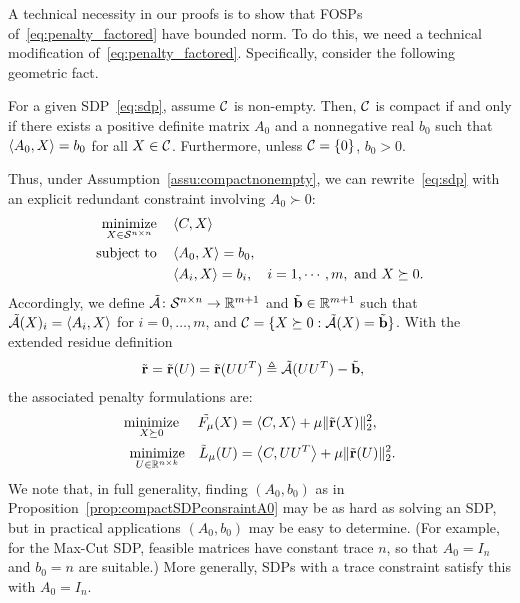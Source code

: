 A technical necessity in our proofs is to show that FOSPs of~\eqref{eq:penalty_factored} have bounded norm. To do this, we need a technical modification of~\eqref{eq:penalty_factored}. Specifically, consider the following geometric fact.
\begin{proposition}\label{prop:compactSDPconsraintA0}
	For a given SDP~\eqref{eq:sdp}, assume $\mathcal{C}$ is non-empty. Then, $\mathcal{C}$ is compact if and only if there exists a positive definite matrix $A_0$ and a nonnegative real $b_0$ such that $\left\langle A_0, X \right\rangle = b_0$ for all $X \in \mathcal{C}$. Furthermore, unless $\mathcal{C} = \{0\}$, $b_0 > 0$.
\end{proposition}
Thus, under Assumption~\ref{assu:compactnonempty}, we can rewrite~\eqref{eq:sdp} with an explicit redundant constraint involving $A_0 \succ 0$:
\begin{align}
	\underset{X \in \mathcal{S}^{n\times n}}{\operatorname*{\mathrm{minimize}}} \quad & \left\langle C, X \right\rangle \nonumber \\
	\text{subject to} \quad & \left\langle A_0, X \right\rangle = b_0, \nonumber\\
							& \left\langle A_i, X \right\rangle = b_i,\quad i = 1,\cdots, m, \textrm{ and } X \succeq 0.
	\label{eq:sdpcompact}
\end{align}
Accordingly, we define $\tilde {\mathcal{A}} \colon \mathcal{S}^{n\times n} \to \mathbb{R}^{m+1}$ and $\tilde {\mathbf{b}} \in \mathbb{R}^{m+1}$ such that $\tilde {\mathcal{A}}(X)_i = \left\langle A_i, X \right\rangle$ for $i = 0, \ldots, m$, and $\mathcal{C} = \{ X \succeq 0 : \tilde {\mathcal{A}}(X) = \tilde {\mathbf{b}} \}$. With the extended residue definition
\begin{align}
	\tilde{\mathbf{r}} & = \tilde{\mathbf{r}}(U) = \tilde{\mathbf{r}}(UU^T) \triangleq \tilde {\mathcal{A}}(UU^T) - \tilde {\mathbf{b}},
\end{align}
the associated penalty formulations are:
\begin{align}
	\underset{X \succeq 0}{\operatorname*{\mathrm{minimize}}} ~\quad \tilde{F_{\mu}}(X) & =  \left\langle C, X \right\rangle + \mu \|\tilde {\mathbf{r}}(X)\|_2^2, \label{eq:penalty_sdp_compact} \\
	\underset{U \in \mathbb{R}^{n\times k}}{\operatorname*{\mathrm{minimize}}} \quad  \tilde L_{\mu}(U) & =  \left\langle C, UU^T \right\rangle + \mu \|\tilde {\mathbf{r}}(U)\|_2^2. \label{eq:penalty_factored_compact}
\end{align}
We note that, in full generality, finding $(A_0, b_0)$ as in Proposition~\ref{prop:compactSDPconsraintA0} may be as hard as solving an SDP, but in practical applications $(A_0, b_0)$ may be easy to determine. (For example, for the Max-Cut SDP,  feasible matrices have constant trace $n$, so that $A_0 = I_n$ and $b_0 = n$ are suitable.) More generally, SDPs with a trace constraint satisfy this with $A_0=I_n$. 

